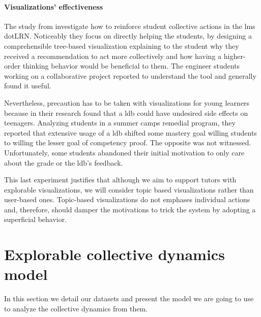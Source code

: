 \documentclass[a4paper,twoside]{article}
\begin{document}
\paragraph{Visualizations' effectiveness}

The study from \cite{Anaya2016} investigate how to reinforce student collective actions in the \gls{lms} dotLRN.  Noticeably they focus on directly helping the students, by designing a comprehensible tree-based visualization explaining to the student why they received a recommendation to act more collectively and how having a higher-order thinking behavior would be beneficial to them.
The engineer students working on a collaborative project reported to understand the tool and generally found it useful.

Nevertheless, precaution has to be taken with visualizations for young learners because in their research \cite{Lonn2015} found that a \gls{ldb} could have undesired side effects on teenagers.  Analyzing students in a summer camps remedial program, they reported that extensive usage of a \gls{ldb} shifted some mastery goal willing students to willing the lesser goal of competency proof.  The opposite was not witnessed.  Unfortunately, some students abandoned their initial motivation to only care about the grade or the \gls{ldb}'s feedback.

This last experiment justifies that although we aim to support tutors with explorable visualizations, we will consider topic based visualizations rather than user-based ones.  Topic-based visualizations do not emphases individual actions and, therefore, should damper the motivations to trick the system by adopting a superficial behavior.


\section{Explorable collective dynamics model}
\label{section:4}
In this section we detail our datasets and present the model we are going to use to analyze the collective dynamics from them.
\end{document}
